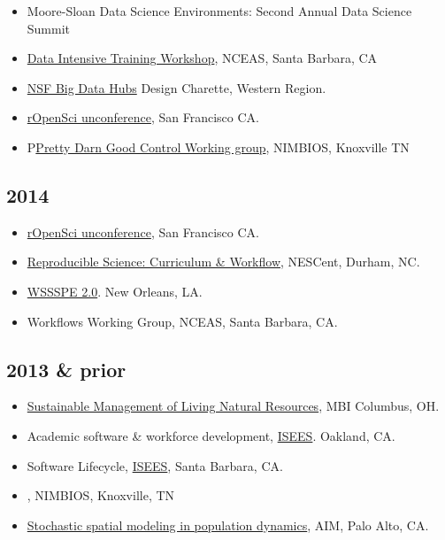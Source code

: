 \documentclass[10pt,sans]{moderncv}        %
\providecommand{\tightlist}{%
    \setlength{\itemsep}{0pt}\setlength{\parskip}{0pt}}
\begin{document}
\begin{itemize}
\tightlist
\item
  Moore-Sloan Data Science Environments: Second Annual Data Science
  Summit
\item
  \href{https://github.com/NCEAS/ds-workshop-2015}{Data Intensive
  Training Workshop}, NCEAS, Santa Barbara, CA
\item
  \href{http://www.nsf.gov/pubs/2015/nsf15562/nsf15562.htm}{NSF Big Data
  Hubs} Design Charette, Western Region.
\item
  \href{http://unconf.ropensci.org/}{rOpenSci unconference}, San
  Francisco CA.
\item
  P\href{http://www.nimbios.org/workinggroups/WG_PDG}{Pretty Darn Good
  Control Working group}, NIMBIOS, Knoxville TN
\end{itemize}

\subsection{2014}\label{section-4}

\begin{itemize}
\tightlist
\item
  \href{http://ropensci.org/blog/2014/05/14/ropenhack/}{rOpenSci
  unconference}, San Francisco CA.
\item
  \href{https://github.com/Reproducible-Science-Curriculum/Reproducible-Science-Hackathon-Dec-08-2014}{Reproducible
  Science: Curriculum \& Workflow}, NESCent, Durham, NC.
\item
  \href{http://wssspe.researchcomputing.org.uk/wssspe2/}{WSSSPE 2.0}.
  New Orleans, LA.
\item
  Workflows Working Group, NCEAS, Santa Barbara, CA.
\end{itemize}

\subsection{2013 \& prior}\label{prior-1}

\begin{itemize}
\tightlist
\item
  \href{http://www.mbi.ohio-state.edu/2013/ws3description.html}{Sustainable
  Management of Living Natural Resources}, MBI Columbus, OH.
\item
  Academic software \& workforce development,
  \href{http://isees.nceas.ucsb.edu}{ISEES}. Oakland, CA.
\item
  Software Lifecycle, \href{http://isees.nceas.ucsb.edu}{ISEES}, Santa
  Barbara, CA.
\item
  , NIMBIOS, Knoxville, TN
\item
  \href{http://www.aimath.org/WWN/populationmodel/}{Stochastic spatial
  modeling in population dynamics}, AIM, Palo Alto, CA.
\end{itemize}
\end{document}
